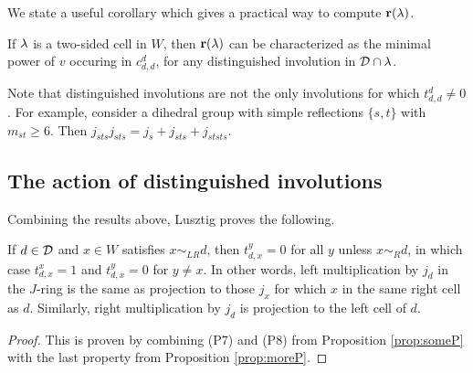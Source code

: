 We state a useful corollary which gives a practical way to compute $\mathbf{r}(\lambda)$.

\begin{cor}\label{cor:computinga}
If $\lambda$ is a two-sided cell in $W$, then $\mathbf{r}(\lambda)$ can be characterized as the minimal power of $v$ occuring in $c^d_{d,d}$, for any distinguished involution in ${\mathcal{D}} \cap \lambda$.
\end{cor}




\begin{ex} Note that distinguished involutions are not the only involutions for which $t^d_{d,d} \ne 0$. For example, consider a dihedral group with simple reflections $\{s,t\}$ with $m_{st} \ge 6$. Then $j_{sts} j_{sts} = j_s + j_{sts} + j_{ststs}$. \end{ex}


\subsection{The action of distinguished involutions}
\label{subsec:invact}

Combining the results above, Lusztig proves the following.

\begin{prop} \label{prop:dacts} If $d \in {\mathcal{D}}$ and $x \in W$ satisfies $x \sim_{LR} d$, then $t^y_{d,x} = 0$ for all $y$ unless $x \sim_R d$, in which case $t^x_{d,x} = 1$ and
$t^y_{d,x} = 0$ for $y \ne x$. In other words, left multiplication by $j_d$ in the $J$-ring is the same as projection to those $j_x$ for which $x$ in the same right cell as $d$.
Similarly, right multiplication by $j_d$ is projection to the left cell of $d$. \end{prop}

\begin{proof} This is proven by combining (P7) and (P8) from Proposition \ref{prop:someP} with the last property from Proposition \ref{prop:moreP}. \end{proof}
	
